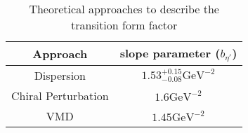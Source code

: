 \begin{table}[h!]
\begin{minipage}{\textwidth}
\begin{center}

\caption[Theoretical approaches]{\label{tab:theory}Theoretical approaches to describe the transition form factor \vspace{0.75mm}}

\begin{tabular}{c|c}

\hline
Approach & slope parameter ($b_{\eta'}$) \\
\hline
Dispersion & $1.53^{+0.15}_{-0.08} \mathrm{GeV^{-2}}$ \\
Chiral Perturbation &  $1.6 \mathrm{GeV^{-2}}$ \\
VMD &  $1.45 \mathrm{GeV^{-2}}$ \\
\hline \hline
\end{tabular}


\end{center}
\end{minipage}
\end{table}